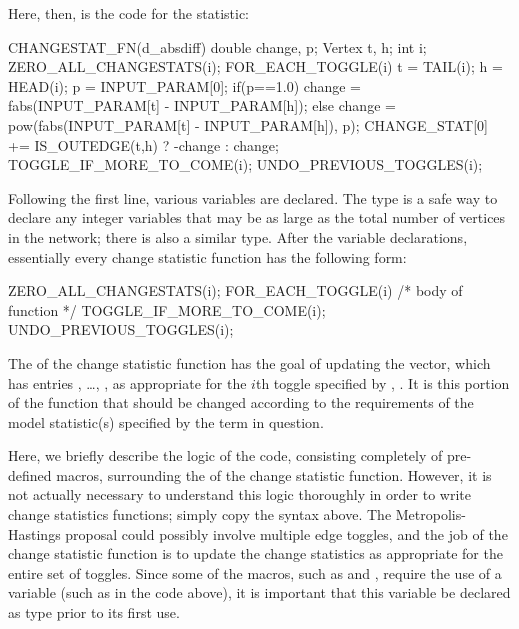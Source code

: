 \documentclass[nojss]{jss}
\begin{document}
Here, then, is the code for the  statistic:
\begin{CodeChunk}
\begin{CodeInput}
CHANGESTAT_FN(d_absdiff) {
  double change, p; Vertex t, h; int i;
  ZERO_ALL_CHANGESTATS(i);
  FOR_EACH_TOGGLE(i) {
    t = TAIL(i); h = HEAD(i);
    p = INPUT_PARAM[0];
    if(p==1.0){
      change = fabs(INPUT_PARAM[t] - INPUT_PARAM[h]);
    }else{
      change = pow(fabs(INPUT_PARAM[t] - INPUT_PARAM[h]), p);
    }
    CHANGE_STAT[0] += IS_OUTEDGE(t,h) ? -change : change;
    TOGGLE_IF_MORE_TO_COME(i);
  }
  UNDO_PREVIOUS_TOGGLES(i);
}
\end{CodeInput}
\end{CodeChunk}
Following the first line, various variables are declared.  The  type
is a safe way to declare any integer variables that may be as large as the total number of
vertices in the network; there is also a similar  type.
After the variable declarations, essentially every change statistic function has the following
form:
\begin{CodeChunk}
\begin{CodeInput}
  ZERO_ALL_CHANGESTATS(i);
  FOR_EACH_TOGGLE(i) {
    /* body of function */
    TOGGLE_IF_MORE_TO_COME(i);
  }
  UNDO_PREVIOUS_TOGGLES(i);
\end{CodeInput}
\end{CodeChunk}
The  of the change statistic function has the goal of
updating the  vector, which has entries
, \ldots,
,
as appropriate for the $i$th toggle specified by
, .  It is this portion of the function that should
be changed according to the requirements of the model statistic(s) specified by 
the term in question.  

Here, we briefly describe the logic of the code, consisting completely of
pre-defined macros, surrounding the  of the change statistic function.
However, it is not actually necessary to understand this logic thoroughly in order to
write change statistics functions; simply copy the syntax above.
The Metropolis-Hastings proposal could possibly involve
multiple edge toggles, and the job of the change statistic function is to update the
change statistics as appropriate for the entire set of toggles.
Since some of the macros, such as  and
,
 require the use of a variable (such as  in the code above), it is important
 that this variable be declared as type  prior to its first use.
\end{document}
